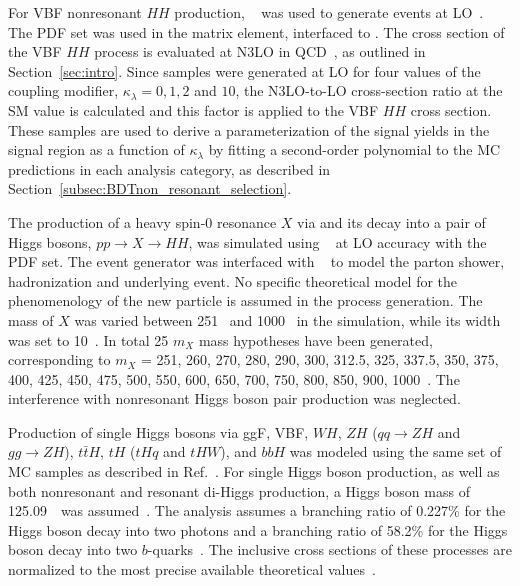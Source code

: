\documentclass[PAPER, cernpreprint, texlive=2016, paper=a4, USenglish, texmf]{atlasdoc}
\begin{document}
 
For VBF nonresonant $HH$ production, \MGNLO[2.6.0]~\cite{Alwall:2014hca} was used to generate events at LO~\cite{Alwall:2014hca,vbf-pheno}.
The \NNPDF[3.0nlo] PDF set \cite{NNPDF} was used in the matrix element, interfaced to \PYTHIA[8.244].
The cross section of the VBF $HH$ process is evaluated at N3LO in QCD~\cite{Liu-Sheng:2014gxa,Dreyer:2018qbw,Dreyer:2018rfu}, as outlined in Section~\ref{sec:intro}.
Since samples were generated at LO for four values of the coupling modifier, $\kappa_\lambda = 0, 1, 2$ and $10$, the N3LO-to-LO cross-section ratio at the SM value is calculated and this factor is applied to the VBF $HH$ cross section.
These samples are used to derive a parameterization of the signal yields in the signal region as a function of $\kappa_\lambda$ by fitting a second-order polynomial to the MC predictions in each analysis category, as described in Section~\ref{subsec:BDTnon_resonant_selection}.
 
The production of a heavy spin-0 resonance $X$ via \ggF{} and its decay into a pair of Higgs bosons,  $pp \rightarrow X \rightarrow H H$, was simulated using \MGNLO[2.6.1]~\cite{Alwall:2014hca} at LO accuracy  with the  \NNPDF[2.3lo] PDF set. The event generator was interfaced with \HERWIG[7.1.3]~\cite{Bahr:2008pv,Bellm:2015jjp} to model the parton shower, hadronization and underlying event. No specific theoretical model for the phenomenology of the new particle is assumed in the process generation.
The mass of $X$  was varied between 251~\GeV{} and 1000~\GeV{} in the simulation, while its width was set to 10~\MeV{}. In total 25 $m_{X}$ mass hypotheses have been generated, corresponding to $m_{X}$ = 251, 260, 270, 280, 290, 300, 312.5, 325, 337.5, 350, 375, 400, 425, 450, 475, 500, 550, 600, 650, 700, 750, 800, 850, 900, 1000~\GeV{}.
The interference with nonresonant Higgs boson pair production was neglected.
 
 
Production of single Higgs bosons via ggF, VBF, $WH$, $ZH$ ($qq\to ZH$ and $gg\to ZH$), $t\bar{t}H$, $tH$ ($tHq$ and $tHW$), and $bbH$ was modeled using the same set of MC samples as described in Ref.~\cite{HIGG-2018-57}.
For single Higgs boson production, as well as both nonresonant and resonant di-Higgs production, a Higgs boson mass of 125.09~\GeV\ was assumed~\cite{HIGG-2014-14}. The analysis assumes a branching ratio of 0.227\% for the Higgs boson decay into two photons and a branching ratio of 58.2\% for the Higgs boson decay into two $b$-quarks~\cite{deFlorian:2016spz,DJOUADI199856}.
The inclusive cross sections of these processes are normalized to the most precise available theoretical values~\cite{deFlorian:2016spz}.  
 
\end{document}
